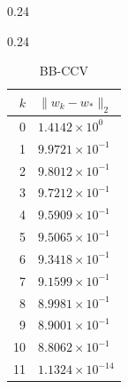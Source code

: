 \documentclass[italian, a4paper, twoside, binding=6mm]{sapthesis}
\begin{document}
\begin{table}[H]
\begin{subtable}{0.24\textwidth}
\end{subtable}\hfill
\begin{subtable}{0.24\textwidth}
\centering
\caption{BB-CCV}
\begin{tabular}{@{}rl@{}}
\toprule
$k$ & $\|w_k-w_*\|_2$\\
\midrule
0 & $1.4142\times10^{0}$\\
1 & $9.9721\times10^{-1}$\\
2 & $9.8012\times10^{-1}$\\
3 & $9.7212\times10^{-1}$\\
4 & $9.5909\times10^{-1}$\\
5 & $9.5065\times10^{-1}$\\
6 & $9.3418\times10^{-1}$\\
7 & $9.1599\times10^{-1}$\\
8 & $8.9981\times10^{-1}$\\
9 & $8.9001\times10^{-1}$\\
10 & $8.8062\times10^{-1}$\\
11 & $1.1324\times10^{-14}$\\
\bottomrule
\end{tabular}
\end{subtable}
\end{table}
\end{document}
